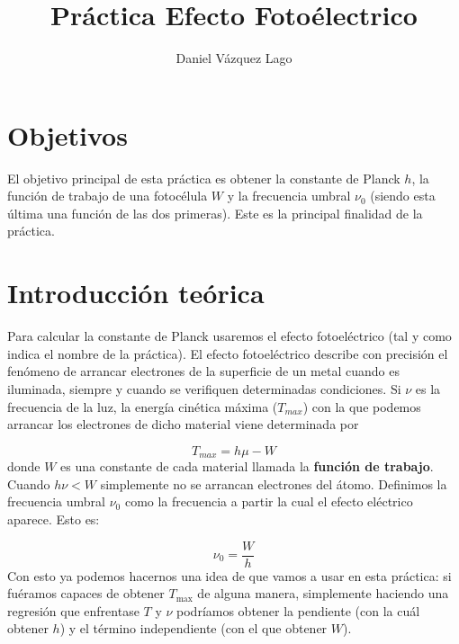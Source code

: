 \documentclass[12pt,a4paper]{article}
\title{Práctica Efecto Fotoélectrico}
\author{Daniel Vázquez Lago}
\numberwithin{equation}{section}
\numberwithin{table}{section}
\numberwithin{figure}{section}
\begin{document}
\maketitle

\newpage

\tableofcontents

\newpage

\section{Objetivos}

El objetivo principal de esta práctica es obtener la constante de Planck $h$, la función de trabajo de una fotocélula $W$  y la frecuencia umbral $\nu_0$ (siendo esta última una función de las dos primeras). Este es la principal finalidad de la práctica. \\


\section{Introducción teórica}

Para calcular la constante de Planck usaremos el efecto fotoeléctrico (tal y como indica el nombre de la práctica). El efecto fotoeléctrico describe con precisión el fenómeno de arrancar electrones de la superficie de un metal cuando es iluminada, siempre y cuando se verifiquen determinadas condiciones. Si $\nu$ es la frecuencia de la luz, la energía cinética máxima ($T_{max}$) con la que podemos arrancar los electrones de dicho material viene determinada por

\begin{equation}
T_{max} = h \mu - W \label{Ec:2.1}
\end{equation}
donde $W$ es una constante de cada material llamada la \textbf{función de trabajo}. Cuando $h \nu < W$ simplemente no se arrancan electrones del átomo. Definimos la frecuencia umbral $\nu_0$ como la frecuencia a partir la cual el efecto eléctrico aparece. Esto es:

\begin{equation}
\nu_0 = \frac{W}{h}
\end{equation}
Con esto ya podemos hacernos una idea de que vamos a usar en esta práctica: si fuéramos capaces de obtener $T_{\max}$ de alguna manera, simplemente haciendo una regresión que enfrentase $T$ y $\nu$ podríamos obtener la pendiente (con la cuál obtener $h$) y el término independiente (con el que obtener $W$). \\
\end{document}

